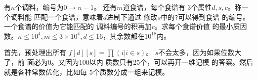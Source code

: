 \begin{prob}
	有$n$个调料，编号为$0 \to n-1$。
	还有$m$道食谱，每个食谱有
	3个属性$d,s,c$。称一个调料能
	匹配一个食谱，意味着$d$进制下通过
	修改$s$中的\texttt{?}可以得到食谱
	的编号。一个食谱的价值为它能匹配的
	调料编号的积再加$c$。求每个食谱价值
	的最小质因数。$n \le 10^4, m \le 3 \times 10^4,
	d \le 16$，其余数都在$10^18$内。
\end{prob}

\begin{sol}
	首先，预处理出所有
	$f[d][s]=\prod (i|i \in s)$。
	$s$不会太多，因为如果位数大了，前
	面必为0。又因为100以内
	质数只有25个，可以再开一维记模
	的答案。然后就是各种常数优化，比如每
	5个质数分成一组来记模。
\end{sol}
